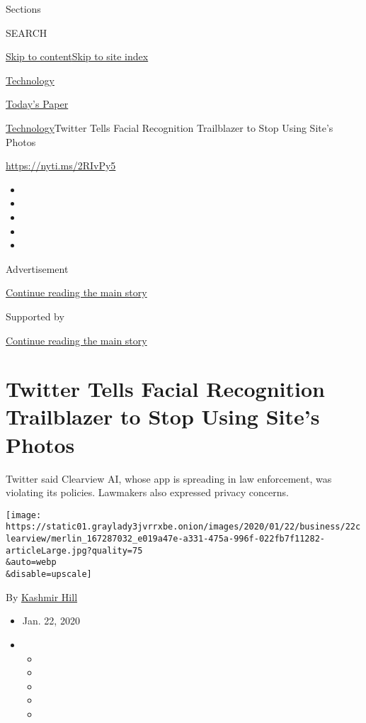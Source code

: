 Sections

SEARCH

\protect\hyperlink{site-content}{Skip to
content}\protect\hyperlink{site-index}{Skip to site index}

\href{https://www.nytimes3xbfgragh.onion/section/technology}{Technology}

\href{https://myaccount.nytimes3xbfgragh.onion/auth/login?response_type=cookie\&client_id=vi}{}

\href{https://www.nytimes3xbfgragh.onion/section/todayspaper}{Today's
Paper}

\href{/section/technology}{Technology}\textbar{}Twitter Tells Facial
Recognition Trailblazer to Stop Using Site's Photos

\href{https://nyti.ms/2RIvPy5}{https://nyti.ms/2RIvPy5}

\begin{itemize}
\item
\item
\item
\item
\item
\end{itemize}

Advertisement

\protect\hyperlink{after-top}{Continue reading the main story}

Supported by

\protect\hyperlink{after-sponsor}{Continue reading the main story}

\hypertarget{twitter-tells-facial-recognition-trailblazer-to-stop-using-sites-photos}{%
\section{Twitter Tells Facial Recognition Trailblazer to Stop Using
Site's
Photos}\label{twitter-tells-facial-recognition-trailblazer-to-stop-using-sites-photos}}

Twitter said Clearview AI, whose app is spreading in law enforcement,
was violating its policies. Lawmakers also expressed privacy concerns.

\texttt{[image: https://static01.graylady3jvrrxbe.onion/images/2020/01/22/business/22clearview/merlin\_167287032\_e019a47e-a331-475a-996f-022fb7f11282-articleLarge.jpg?quality=75\\\&auto=webp\\\&disable=upscale]}

By \href{https://www.nytimes3xbfgragh.onion/by/kashmir-hill}{Kashmir
Hill}

\begin{itemize}
\item
  Jan. 22, 2020
\item
  \begin{itemize}
  \item
  \item
  \item
  \item
  \item
  \end{itemize}
\end{itemize}

